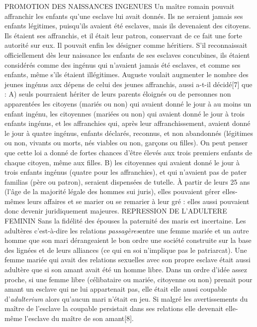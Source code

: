 PROMOTION DES NAISSANCES INGENUES
 Un maître romain pouvait affranchir les enfants qu'une esclave lui avait donnés. Ils ne seraient jamais ses enfants légitimes, puisqu'ils avaient été esclaves, mais ils devenaient des citoyens. Ils étaient ses affranchis, et il était leur patron, conservant de ce fait une forte autorité sur eux. Il pouvait enfin les désigner comme héritiers. S'il reconnaissait officiellement dès leur naissance les enfants de ses esclaves concubines, ils étaient considérés comme des ingénus qui n'avaient jamais été esclaves, et comme ses enfants, même s'ils étaient illégitimes. 
 Auguste voulait augmenter le nombre des jeunes ingénus aux dépens de celui des jeunes affranchis, aussi a-t-il décidé[7] que : A) seuls pourraient hériter de leurs parents éloignés ou de personnes non apparentées les citoyens (mariés ou non) qui avaient donné le jour à au moins un enfant ingénu, les citoyennes (mariées ou non) qui avaient donné le jour à trois enfants ingénus, et les affranchies qui, après leur affranchissement, avaient donné le jour à quatre ingénus, enfants déclarés, reconnus, et non abandonnés (légitimes ou non, vivants ou morts, nés viables ou non, garçons ou filles). On peut penser que cette loi a donné de fortes chances d'être élevés aux trois premiers enfants de chaque citoyen, même aux filles. B) les citoyennes qui avaient donné le jour à trois enfants ingénus (quatre pour les affranchies), et qui n'avaient pas de pater familias (père ou patron), seraient dispensées de tutelle. À partir de leurs 25 ans (l'âge de la majorité légale des hommes sui juris), elles pouvaient gérer elles-mêmes leurs affaires et se marier ou se remarier à leur gré : elles aussi pouvaient donc devenir juridiquement majeures. 
REPRESSION DE L'ADULTERE FEMININ
 Sans la fidélité des épouses la paternité des maris est incertaine. Les adultères c'est-à-dire les relations \emph{passagères}entre une femme mariée et un autre homme que son mari dérangeaient le bon ordre une société construite sur la base des lignées et de leurs alliances (ce qui en soi n'implique pas le patriarcat). Une femme mariée qui avait des relations sexuelles avec son propre esclave était aussi adultère que si son amant avait été un homme libre. Dans un ordre d'idée assez proche, si une femme libre (célibataire ou mariée, citoyenne ou non) prenait pour amant un esclave qui ne lui appartenait pas, elle était elle aussi coupable d'\emph{adulterium} alors qu'aucun mari n'était en jeu. Si malgré les avertissements du maître de l'esclave la coupable persistait dans ses relations elle devenait elle-même l'esclave du maître de son amant[8].
